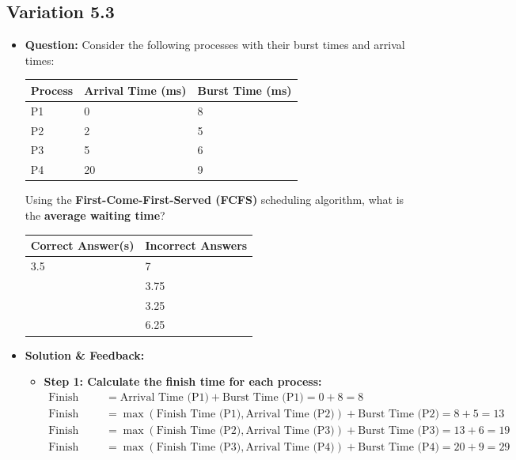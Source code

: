 \subsection{Variation 5.3}
\begin{itemize}
    \item \textbf{Question:} Consider the following processes with their burst times and arrival times:
    
    \begin{tabular}{|l|l|l|}
        \hline
        \textbf{Process} & \textbf{Arrival Time (ms)} & \textbf{Burst Time (ms)} \\
        \hline
        P1 & 0 & 8 \\
        P2 & 2 & 5 \\
        P3 & 5 & 6 \\
        P4 & 20 & 9 \\
        \hline
    \end{tabular}
    
    Using the \textbf{First-Come-First-Served (FCFS)} scheduling algorithm, what is the \textbf{average waiting time}?
    
    \begin{tabular}{|l|l|}
        \hline
        \textbf{Correct Answer(s)} & \textbf{Incorrect Answers} \\
        \hline
        3.5 & 7 \\
         & 3.75 \\
         & 3.25 \\
         & 6.25 \\
        \hline
    \end{tabular}
    
    \item \textbf{Solution \& Feedback:}
    \begin{itemize}
        \item \textbf{Step 1: Calculate the finish time for each process:}
        \begin{align*}
            \text{Finish Time (P1)} &= \text{Arrival Time (P1)} + \text{Burst Time (P1)} = 0 + 8 = 8 \\
            \text{Finish Time (P2)} &= \max(\text{Finish Time (P1)}, \text{Arrival Time (P2)}) + \text{Burst Time (P2)} = 8 + 5 = 13 \\
            \text{Finish Time (P3)} &= \max(\text{Finish Time (P2)}, \text{Arrival Time (P3)}) + \text{Burst Time (P3)} = 13 + 6 = 19 \\
            \text{Finish Time (P4)} &= \max(\text{Finish Time (P3)}, \text{Arrival Time (P4)}) + \text{Burst Time (P4)} = 20 + 9 = 29 \\
        \end{align*}
        

\end{itemize}
\end{itemize}
